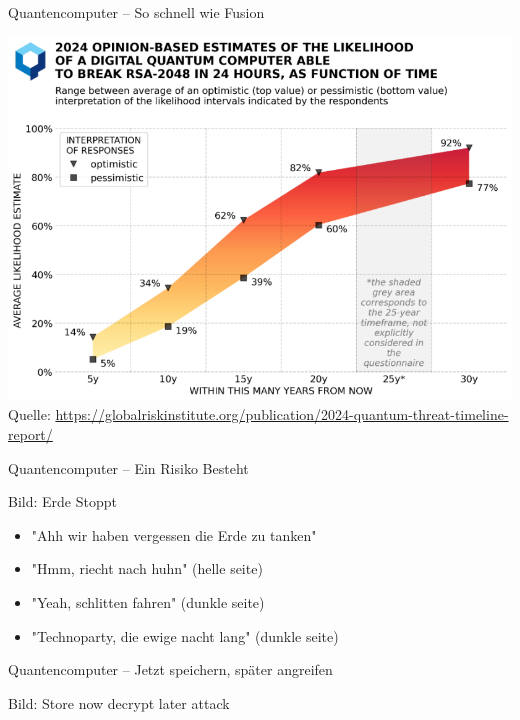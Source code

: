 \begin{frame}[T]{Quantencomputer – So schnell wie Fusion}
  
\includegraphics[width=.92\linewidth,clip,trim=0  0 0 120]{graphics/quantum-timeline.png}
Quelle: \url{https://globalriskinstitute.org/publication/2024-quantum-threat-timeline-report/}

\end{frame}


\begin{frame}[T]{Quantencomputer – Ein Risiko Besteht}

Bild: Erde Stoppt
\begin{itemize}
  \item "Ahh wir haben vergessen die Erde zu tanken"
  \item "Hmm, riecht nach huhn" (helle seite)
  \item "Yeah, schlitten fahren" (dunkle seite)
  \item "Technoparty, die ewige nacht lang" (dunkle seite)
\end{itemize}

\end{frame}


\begin{frame}[T]{Quantencomputer – Jetzt speichern, später angreifen}

Bild: Store now decrypt later attack

\end{frame}
